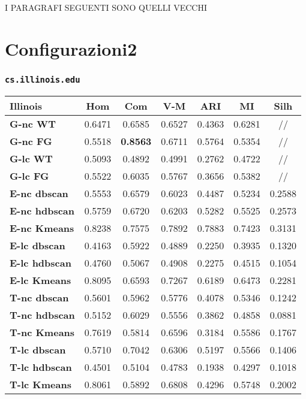 \color{red}
I PARAGRAFI SEGUENTI SONO QUELLI VECCHI

\section{Configurazioni2}

\subsubsection{\texttt{cs.illinois.edu}}
\begin{table}[H]
	\begin{tabular}{| l | c | c | c | c | c | c |}
	\hline
	\textbf{Illinois}  & \textbf{Hom} & \textbf{Com} & \textbf{V-M}  & \textbf{ARI}  & \textbf{MI} & \textbf{Silh}\\ [2ex] \hline
	\textbf{G-nc WT} & 0.6471 & 0.6585 & 0.6527 & 0.4363 & 0.6281 & //\\ [2ex]
	 \hline
	\textbf{G-nc FG} & 0.5518 & \textbf{0.8563} & 0.6711 & 0.5764 & 0.5354 & //\\ [2ex]
	 \hline	
	\textbf{G-lc WT} & 0.5093 & 0.4892 & 0.4991 & 0.2762 & 0.4722 & //\\ [2ex]
	 \hline	
	\textbf{G-lc FG} & 0.5522 & 0.6035 & 0.5767 & 0.3656 & 0.5382 & //\\ [2ex]
	\hline
	
	\textbf{E-nc dbscan} & 0.5553 & 0.6579 & 0.6023 & 0.4487 & 0.5234 & 0.2588\\ [2ex]
	 \hline 
	\textbf{E-nc hdbscan} & 0.5759 & 0.6720 & 0.6203 & 0.5282 & 0.5525 & 0.2573\\ [2ex]
	 \hline
	\textbf{E-nc Kmeans} & 0.8238 & 0.7575 & 0.7892 & 0.7883 & 0.7423 & 0.3131\\ [2ex]
	 \hline	
	\textbf{E-lc dbscan} & 0.4163 & 0.5922 & 0.4889 & 0.2250 & 0.3935 & 0.1320\\ [2ex]
	\hline
	\textbf{E-lc hdbscan} & 0.4760 & 0.5067 & 0.4908 & 0.2275 & 0.4515 & 0.1054\\ [2ex]
	\hline
	\textbf{E-lc Kmeans} & 0.8095 & 0.6593 & 0.7267 & 0.6189 & 0.6473 & 0.2281\\ [2ex]
	\hline
	
	\textbf{T-nc dbscan} & 0.5601 & 0.5962 & 0.5776 & 0.4078 & 0.5346 & 0.1242\\ [2ex]
	 \hline 
	\textbf{T-nc hdbscan} & 0.5152 & 0.6029 & 0.5556 & 0.3862 & 0.4858 & 0.0881\\ [2ex]
	 \hline
	\textbf{T-nc Kmeans} & 0.7619 & 0.5814 & 0.6596 & 0.3184 & 0.5586 & 0.1767\\ [2ex]
	 \hline	
	\textbf{T-lc dbscan} & 0.5710 & 0.7042 & 0.6306 & 0.5197 & 0.5566 & 0.1406\\ [2ex]
	\hline
	\textbf{T-lc hdbscan} & 0.4501 & 0.5104 & 0.4783 & 0.1938 & 0.4297 & 0.1018\\ [2ex]
	\hline
	\textbf{T-lc Kmeans} & 0.8061 & 0.5892 & 0.6808 & 0.4296 & 0.5748 & 0.2002\\ [2ex]
	\hline
	

\end{tabular}
\end{table}
